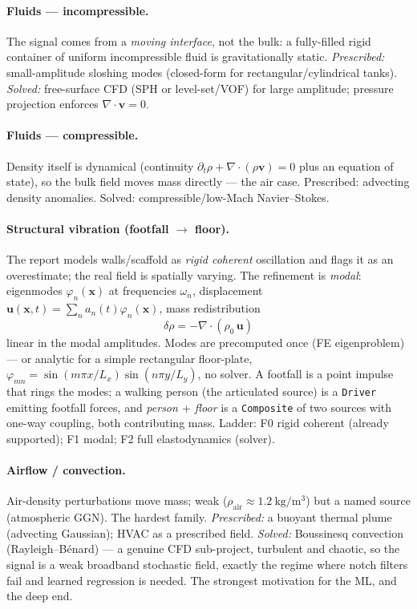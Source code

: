 \documentclass[11pt,a4paper]{article}
\theoremstyle{reqstyle}
\newcommand{\vv}{\mathbf{v}}
\newcommand{\xv}{\mathbf{x}}
\newcommand{\grad}{\nabla}
\begin{document}
\paragraph{Fluids --- incompressible.} The signal comes from a \emph{moving interface}, not
the bulk: a fully-filled rigid container of uniform incompressible fluid is gravitationally
static. \emph{Prescribed:} small-amplitude sloshing modes (closed-form for
rectangular/cylindrical tanks). \emph{Solved:} free-surface CFD (SPH or level-set/VOF) for
large amplitude; pressure projection enforces $\grad\!\cdot\!\vv = 0$.

\paragraph{Fluids --- compressible.} Density itself is dynamical (continuity
$\partial_t\rho + \grad\!\cdot(\rho\vv)=0$ plus an equation of state), so the bulk field
moves mass directly --- the air case. Prescribed: advecting density anomalies. Solved:
compressible/low-Mach Navier--Stokes.

\paragraph{Structural vibration (footfall $\to$ floor).} The report models walls/scaffold as
\emph{rigid coherent} oscillation and flags it as an overestimate; the real field is
spatially varying. The refinement is \emph{modal}: eigenmodes $\varphi_n(\xv)$ at
frequencies $\omega_n$, displacement $\mathbf u(\xv,t)=\sum_n a_n(t)\varphi_n(\xv)$, mass
redistribution
\begin{equation}
\delta\rho = -\grad\!\cdot(\rho_0\,\mathbf u)
\end{equation}
linear in the modal amplitudes. Modes are precomputed once (FE eigenproblem) --- or
analytic for a simple rectangular floor-plate, $\varphi_{mn}=\sin(m\pi x/L_x)\sin(n\pi
y/L_y)$, no solver. A footfall is a point impulse that rings the modes; a walking person
(the articulated source) is a \texttt{Driver} emitting footfall forces, and \emph{person $+$
floor} is a \texttt{Composite} of two sources with one-way coupling, both contributing mass.
Ladder: F0 rigid coherent (already supported); F1 modal; F2 full elastodynamics (solver).

\paragraph{Airflow / convection.} Air-density perturbations move mass; weak
($\rho_{\text{air}}\approx\SI{1.2}{\kilogram\per\cubic\metre}$) but a named source
(atmospheric GGN). The hardest family. \emph{Prescribed:} a buoyant thermal plume (advecting
Gaussian); HVAC as a prescribed field. \emph{Solved:} Boussinesq convection
(Rayleigh--B\'enard) --- a genuine CFD sub-project, turbulent and chaotic, so the signal is a
weak broadband stochastic field, exactly the regime where notch filters fail and learned
regression is needed. The strongest motivation for the ML, and the deep end.
\end{document}
